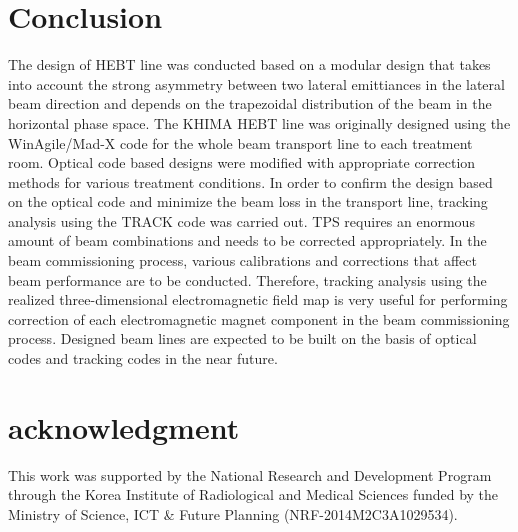\documentclass[jkps,preprint,fleqn,showpacs,showkeys]{revtex4}
\begin{document}
\section{Conclusion}
\label{sec:Con}
The design of HEBT line was conducted based on a modular design that takes into account the strong asymmetry
between two lateral emittiances in the lateral beam direction and depends on the trapezoidal distribution of the beam in the horizontal phase space.
The KHIMA HEBT line was originally designed using the WinAgile/Mad-X code for the whole beam transport line to each treatment room.
Optical code based designs were modified with appropriate correction methods for various treatment conditions. 
In order to confirm the design based on the optical code and minimize the beam loss in the transport line,
tracking analysis using the TRACK code was carried out.
TPS requires an enormous amount of beam combinations and needs to be corrected appropriately.
In the beam commissioning process, various calibrations and corrections that affect beam performance are to be conducted.
Therefore, tracking analysis using the realized three-dimensional electromagnetic field map is very useful
for performing correction of each electromagnetic magnet component in the beam commissioning process.
Designed beam lines are expected to be built on the basis of optical codes and tracking codes in the near future.
\section{acknowledgment}
This work was supported by the National Research and Development Program through the Korea Institute of Radiological and Medical Sciences
funded by the Ministry of Science, ICT \& Future Planning (NRF-2014M2C3A1029534).
\end{document}
